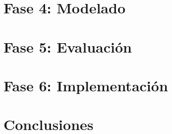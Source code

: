 	\newpage
	\section{Fase 4: Modelado}
		

	\newpage
	\section{Fase 5: Evaluación}
		

	\newpage
	\section{Fase 6: Implementación}
		

	\newpage
	\section{Conclusiones}
		

